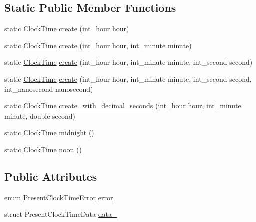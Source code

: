 \subsection*{\-Static \-Public \-Member \-Functions}
\begin{DoxyCompactItemize}
\item 
static \hyperlink{structClockTime}{\-Clock\-Time} \hyperlink{structClockTime_a72284f0c4f53d026688e55cea607f219}{create} (int\-\_\-hour hour)
\item 
static \hyperlink{structClockTime}{\-Clock\-Time} \hyperlink{structClockTime_aa4429a92963b67343bc6eab885938a5a}{create} (int\-\_\-hour hour, int\-\_\-minute minute)
\item 
static \hyperlink{structClockTime}{\-Clock\-Time} \hyperlink{structClockTime_a3a34039699358c31a6f68d545f228728}{create} (int\-\_\-hour hour, int\-\_\-minute minute, int\-\_\-second second)
\item 
static \hyperlink{structClockTime}{\-Clock\-Time} \hyperlink{structClockTime_afdf4e7a0b63e536f24a5eb85a3eb1ae8}{create} (int\-\_\-hour hour, int\-\_\-minute minute, int\-\_\-second second, int\-\_\-nanosecond nanosecond)
\item 
static \hyperlink{structClockTime}{\-Clock\-Time} \hyperlink{structClockTime_a71e4e398da2cb0cfd3adb3f87cb6f3c2}{create\-\_\-with\-\_\-decimal\-\_\-seconds} (int\-\_\-hour hour, int\-\_\-minute minute, double second)
\item 
static \hyperlink{structClockTime}{\-Clock\-Time} \hyperlink{structClockTime_a7baab35d60ad3a2236c14133d8d0083b}{midnight} ()
\item 
static \hyperlink{structClockTime}{\-Clock\-Time} \hyperlink{structClockTime_ae206b86808ff1d0158cbc920eb289797}{noon} ()
\end{DoxyCompactItemize}
\subsection*{\-Public \-Attributes}
\begin{DoxyCompactItemize}
\item 
enum \hyperlink{clock-time_8h_a40f97cceae12156ea6da9bd1c170d455}{\-Present\-Clock\-Time\-Error} \hyperlink{structClockTime_a58f5305f36468eee0d1c489b5d72d717}{error}
\item 
struct \-Present\-Clock\-Time\-Data \hyperlink{structClockTime_a3fe115dffef3ba153e1fff6e0b2c0a23}{data\-\_\-}
\end{DoxyCompactItemize}
